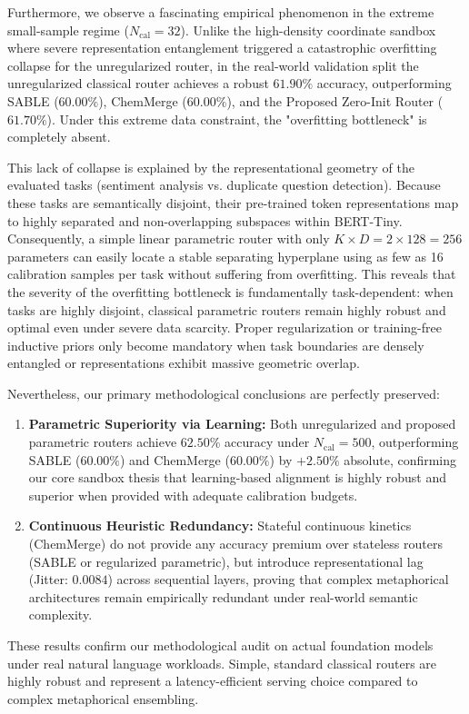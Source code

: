 Furthermore, we observe a fascinating empirical phenomenon in the extreme small-sample regime ($N_{\text{cal}}=32$). Unlike the high-density coordinate sandbox where severe representation entanglement triggered a catastrophic overfitting collapse for the unregularized router, in the real-world validation split the unregularized classical router achieves a robust $61.90\%$ accuracy, outperforming SABLE ($60.00\%$), ChemMerge ($60.00\%$), and the Proposed Zero-Init Router ($61.70\%$). Under this extreme data constraint, the "overfitting bottleneck" is completely absent.

This lack of collapse is explained by the representational geometry of the evaluated tasks (sentiment analysis vs. duplicate question detection). Because these tasks are semantically disjoint, their pre-trained token representations map to highly separated and non-overlapping subspaces within BERT-Tiny. Consequently, a simple linear parametric router with only $K \times D = 2 \times 128 = 256$ parameters can easily locate a stable separating hyperplane using as few as 16 calibration samples per task without suffering from overfitting. This reveals that the severity of the overfitting bottleneck is fundamentally task-dependent: when tasks are highly disjoint, classical parametric routers remain highly robust and optimal even under severe data scarcity. Proper regularization or training-free inductive priors only become mandatory when task boundaries are densely entangled or representations exhibit massive geometric overlap.

Nevertheless, our primary methodological conclusions are perfectly preserved:
\begin{enumerate}
    \item \textbf{Parametric Superiority via Learning:} Both unregularized and proposed parametric routers achieve $62.50\%$ accuracy under $N_{\text{cal}}=500$, outperforming SABLE ($60.00\%$) and ChemMerge ($60.00\%$) by $+2.50\%$ absolute, confirming our core sandbox thesis that learning-based alignment is highly robust and superior when provided with adequate calibration budgets.
    \item \textbf{Continuous Heuristic Redundancy:} Stateful continuous kinetics (ChemMerge) do not provide any accuracy premium over stateless routers (SABLE or regularized parametric), but introduce representational lag (Jitter: $0.0084$) across sequential layers, proving that complex metaphorical architectures remain empirically redundant under real-world semantic complexity.
\end{enumerate}

These results confirm our methodological audit on actual foundation models under real natural language workloads. Simple, standard classical routers are highly robust and represent a latency-efficient serving choice compared to complex metaphorical ensembling.
